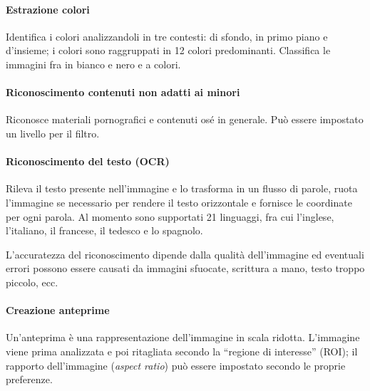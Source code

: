 \paragraph{Estrazione colori} Identifica i colori analizzandoli in tre contesti: di sfondo, in primo piano e d'insieme; i colori sono raggruppati in 12 colori predominanti. Classifica le immagini fra in bianco e nero e a colori.

\paragraph{Riconoscimento contenuti non adatti ai minori} Riconosce materiali pornografici e contenuti osé in generale. Può essere impostato un livello per il filtro.

\paragraph{Riconoscimento del testo (OCR)} Rileva il testo presente nell'immagine e lo trasforma in un flusso di parole, ruota l'immagine se necessario per rendere il testo orizzontale e fornisce le coordinate per ogni parola. Al momento sono supportati 21 linguaggi, fra cui l'inglese, l'italiano, il francese, il tedesco e lo spagnolo.

L'accuratezza del riconoscimento dipende dalla qualità dell'immagine ed eventuali errori possono essere causati da immagini sfuocate, scrittura a mano, testo troppo piccolo, ecc.
   
\paragraph{Creazione anteprime} Un'anteprima è una rappresentazione dell'immagine in scala ridotta. L'immagine viene prima analizzata e poi ritagliata secondo la ``regione di interesse'' (ROI); il rapporto dell'immagine (\textit{aspect ratio}) può essere impostato secondo le proprie preferenze.

